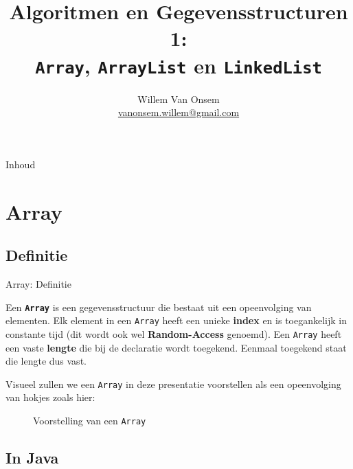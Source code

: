 \documentclass[handout]{beamer}
\title{Algoritmen en Gegevensstructuren 1:\\ \texttt{Array}, \texttt{ArrayList} en \texttt{LinkedList}}
\author{Willem Van Onsem\\ \href{mailto:vanonsem.willem@gmail.com?Subject=Presentatie\%20Algoritmen\%20en\%20Gegevensstructuren\%201}{vanonsem.willem@gmail.com}}
\newcommand{\term}[1]{\textbf{#1}}
\newcommand{\dsarray}{\texttt{Array}}
\begin{document}
\begin{frame}
\maketitle
\end{frame}
\begin{frame}[plain]{Inhoud}
\begin{multicols}{2}
\tableofcontents
\end{multicols}
\end{frame}
\section{Array}
\subsection{Definitie}
\begin{frame}{Array: Definitie}
\begin{definition}[Array]
Een \term{\dsarray{}} is een gegevensstructuur die bestaat uit een opeenvolging van elementen. Elk element in een \dsarray{} heeft een unieke \term{index} en is toegankelijk in constante tijd (dit wordt ook wel \term{Random-Access} genoemd). Een \dsarray{} heeft een vaste \term{lengte} die bij de declaratie wordt toegekend. Eenmaal toegekend staat die lengte dus vast.
\end{definition}
Visueel zullen we een \dsarray{} in deze presentatie voorstellen als een opeenvolging van hokjes zoals hier:
\begin{figure}
\caption{Voorstelling van een \dsarray{}}
\end{figure}
\end{frame}
\subsection{In Java}
\end{document}
